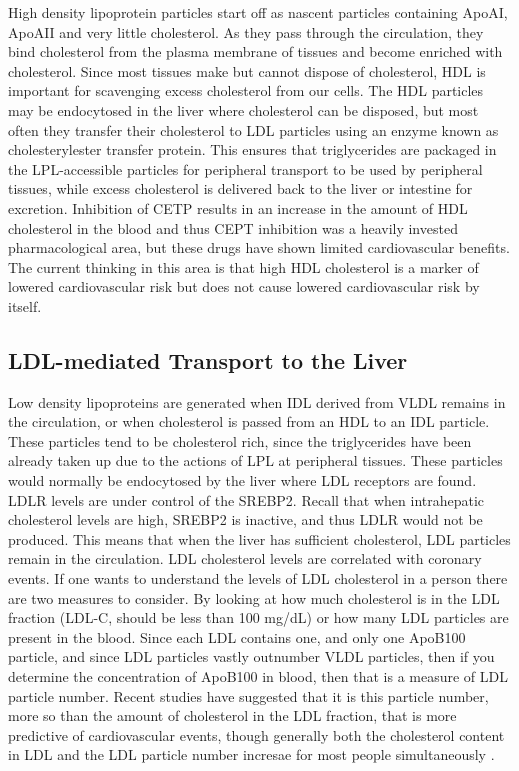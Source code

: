 \documentclass{tufte-handout}
\begin{document}
High density lipoprotein particles start off as nascent particles containing ApoAI, ApoAII and very little cholesterol.  As they pass through the circulation, they bind cholesterol from the plasma membrane of tissues and become enriched with cholesterol.  Since most tissues make but cannot dispose of cholesterol, HDL is important for scavenging excess cholesterol from our cells. The HDL particles may be endocytosed in the liver where cholesterol can be disposed, but most often they transfer their cholesterol to LDL particles using an enzyme known as cholesterylester transfer protein.  This ensures that triglycerides are packaged in the LPL-accessible particles for peripheral transport to be used by peripheral tissues, while excess cholesterol is delivered back to the liver or intestine for excretion.   Inhibition of CETP results in an increase in the amount of  HDL cholesterol in the blood and thus CEPT inhibition was a heavily invested pharmacological area, but these drugs have shown limited cardiovascular benefits.  The current thinking in this area is that high HDL cholesterol is a marker of lowered cardiovascular risk but does not cause lowered cardiovascular risk by itself.

\subsection{LDL-mediated Transport to the Liver}

Low density lipoproteins are generated when IDL derived from VLDL remains in the circulation, or when cholesterol is passed from an HDL to an IDL particle.  These particles tend to be cholesterol rich, since the triglycerides have been already taken up due to the actions of LPL at peripheral tissues.  These particles would normally be endocytosed by the liver where LDL receptors are found.  LDLR levels are under control of the SREBP2.  Recall that when intrahepatic cholesterol levels are high, SREBP2 is inactive, and thus LDLR would not be produced.  This means that when the liver has sufficient cholesterol, LDL particles remain in the circulation.  LDL cholesterol levels are correlated with coronary events.  If one wants to understand the levels of LDL cholesterol in a person there are two measures to consider.  By looking at how much cholesterol is in the LDL fraction (LDL-C, should be less than 100 mg/dL) or how many LDL particles are present in the blood.  Since each LDL contains one, and only one ApoB100 particle, and since LDL particles vastly outnumber VLDL particles, then if you determine the concentration of ApoB100 in blood, then that is a measure of LDL particle number.  Recent studies have suggested that it is this particle number, more so than the amount of cholesterol in the LDL fraction, that is more predictive of cardiovascular events, though generally both the cholesterol content in LDL and the LDL particle number incresae for most people simultaneously \citep{Cromwell2007,Mora2007}.
\end{document}
